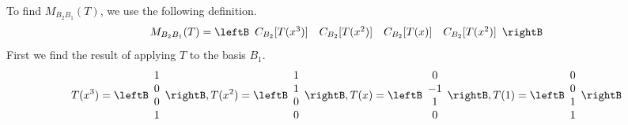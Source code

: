 \begin{solution}
To find $M_{B_2B_1}(T)$, we use the following definition.
\[
M_{B_2B_1}(T) = \leftB 
\begin{array}{cccc}
C_{B_2}[T(x^3)] & C_{B_2}[T(x^2)] & C_{B_2}[T(x)] & C_{B_2}[T(x^2)]
\end{array}
\rightB
\]
First we find the result of applying $T$ to the basis $B_1$.
\[
T(x^3)  = \leftB \begin{array}{c}
1 \\
0 \\
0 \\
1 
\end{array} \rightB, 
T(x^2)  = \leftB \begin{array}{c}
1 \\
1 \\
0  \\
0 
\end{array} \rightB, 
T(x) = \leftB \begin{array}{c}
0  \\
-1 \\
1  \\
0 
\end{array} \rightB, 
T(1) = \leftB \begin{array}{c}
0  \\
0  \\
1 \\
1 
\end{array} \rightB
\]


\end{solution}
